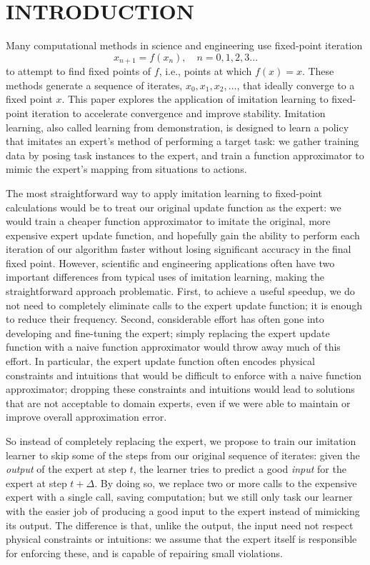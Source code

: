 \documentclass[twoside,11pt]{article}
\begin{document}
\section{INTRODUCTION}


Many computational methods in science and engineering use fixed-point iteration
\[
x_{n+1} = f(x_n), \quad n = 0,1,2,3...
\]
to attempt to find fixed points of $f$, i.e., points at which $f(x)=x$. These methods generate a sequence of iterates, $x_0, x_1, x_2, \ldots$, that ideally converge to a fixed point $x$. This paper explores the application of imitation learning to fixed-point iteration to accelerate convergence and improve stability. Imitation learning, also called learning from demonstration, is designed to learn a policy that imitates an expert's method of performing a target task: we gather training data by posing task instances to the expert, and train a function approximator to mimic the expert's mapping from situations to actions.

The most straightforward way to apply imitation learning to fixed-point calculations would be to treat our original update function as the expert: we would train a cheaper function approximator to imitate the original, more expensive expert update function, and hopefully gain the ability to perform each iteration of our algorithm faster without losing significant accuracy in the final fixed point.  
%
However, scientific and engineering applications often have two important differences from typical uses of imitation learning, making the straightforward approach problematic.  First, to achieve a useful speedup, we do not need to completely eliminate calls to the expert update function; it is enough to reduce their frequency.  Second, considerable effort has often gone into developing and fine-tuning the expert; simply replacing the expert update function with a naive function approximator would throw away much of this effort.  In particular, the expert update function often encodes physical constraints and intuitions that would be difficult to enforce with a naive function approximator; dropping these constraints and intuitions would lead to solutions that are not acceptable to domain experts, even if we were able to maintain or improve overall approximation error.

So instead of completely replacing the expert, we propose to train our imitation learner to skip some of the steps from our original sequence of iterates: given the \emph{output} of the expert at step $t$, the learner tries to predict a good \emph{input} for the expert at step $t+\Delta$.  By doing so, we replace two or more calls to the expensive expert with a single call, saving computation; but we still only task our learner with the easier job of producing a good input to the expert instead of mimicking its output.  The difference is that, unlike the output, the input need not respect physical constraints or intuitions: we assume that the expert itself is responsible for enforcing these, and is capable of repairing small violations.
\end{document}
